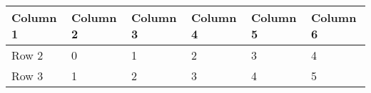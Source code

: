 \begin{table}[htbp]
\centering
\begin{tabular}{|l|l|l|l|l|l|}
\hline
Column 1 & Column 2 & Column 3 & Column 4 & Column 5 & Column 6 \\ \hline
Row 2    & 0        & 1        & 2        & 3        & 4        \\ \hline
Row 3    & 1        & 2        & 3        & 4        & 5        \\ \hline
\end{tabular}
\label{tab:test}
\caption{}
\end{table}